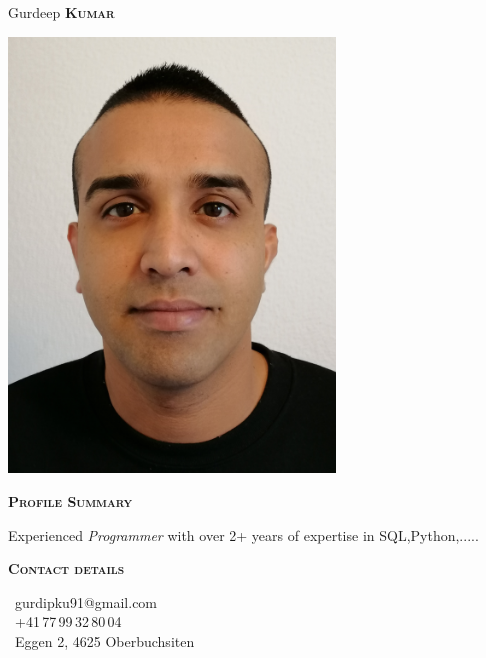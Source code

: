\documentclass[11pt, a4paper]{article}
\newcommand{\headleft}[1]{\vspace*{3ex}\textsc{\textbf{#1}}\par%
    \vspace*{-1.5ex}\hrulefill\par\vspace*{0.7ex}}
\begin{document}
\setlength{\topskip}{0pt}
\setlength{\parindent}{0pt}
\setlength{\parskip}{0pt}
\setlength{\fboxsep}{0pt}
\pagestyle{empty}
\raggedbottom

\begin{minipage}[t]{0.33\textwidth} %
\colorbox{cvblue}{\begin{minipage}[t][5mm][t]{\textwidth}\null\hfill\null\end{minipage}}

\vspace{-.2ex} %
\colorbox{cvblue!90}{\color{white}  %
\textwidth\relax%
\begin{minipage}[t][293mm][t]{0.82\textwidth}
\raggedright
\vspace*{2.5ex}

\Large Gurdeep \textbf{\textsc{Kumar}} \normalsize 

\null\hfill\includegraphics[width=0.65\textwidth]{foto.jpg}\hfill\null

\vspace*{0.5ex} %

\headleft{Profile Summary}
Experienced \textit{Programmer} with over 2+ years of expertise in SQL,Python,.....

\headleft{Contact details}
\small %
\MVAt\ {\small gurdipku91@gmail.com} \\[0.4ex]
\Mobilefone\ +41\,77\,99\,32\,80\,04 \\[0.5ex]
\Letter\ Eggen 2, 4625 Oberbuchsiten
\normalsize


\end{minipage}}
\end{minipage}
\end{document}
